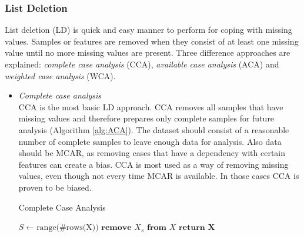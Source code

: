 \documentclass[10pt,a4paper]{report}
\begin{document}
	
	\subsubsection{List Deletion}
	\label{MVsubsec:ListDeletion}
	
	List deletion (LD) is quick and easy manner to perform for coping with missing values. Samples or features are removed when they consist of at least one missing value until no more missing values are present. Three difference approaches are explained: \textit{complete case analysis} (CCA), \textit{available case analysis} (ACA) and \textit{weighted case analysis} (WCA).
	
	\begin{itemize}
		
		\item \textit{Complete case analysis} \\
		CCA is the most basic LD approach. CCA removes all samples that have missing values and therefore prepares only complete samples for future analysis (Algorithm \ref{alg:ACA}). The dataset should consist of a reasonable number of complete samples to leave enough data for analysis. Also data should be MCAR, as removing cases that have a dependency with certain features can create a bias. CCA is most used as a way of removing missing values, even though not every time MCAR is available\cite{haukoos2007advanced, patrician2002multiple, myrtveit2001analyzing, donders2006gentle}. In those cases CCA is proven to be biased\cite{cartwright2003dealing}.
		
		\begin{algorithm}[H]
			\caption{Complete Case Analysis}\label{alg:CCA}
			\begin{algorithmic}[1]
				\State $S \gets \text{range(\#rows(X))}$ 	
				 					
				 				 			
				\State $\textbf{remove } X_s \textbf{ from } X$ 				
				\EndIf
				\EndFor
				\State $\textbf{return X}$
				\EndProcedure
			\end{algorithmic}
		\end{algorithm}	
		

\end{itemize}
\end{document}
